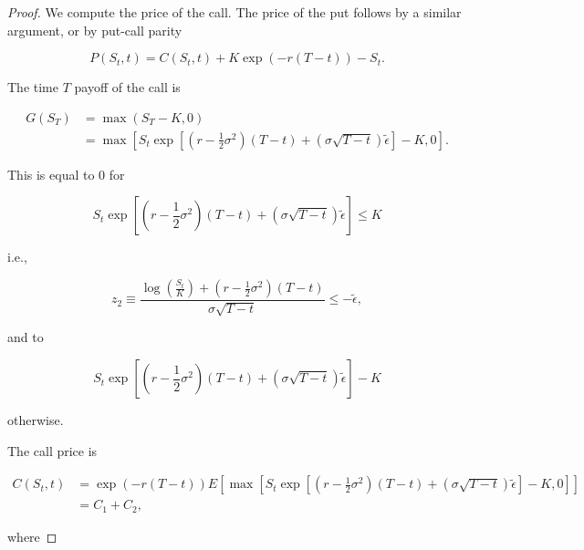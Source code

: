 \documentclass[\topdir/lecture\_notes.tex]{subfiles}
\begin{document}
\begin{proof}
We compute the price of the call. The price of the put follows by a similar argument, or by put-call parity

\begin{equation}
P\left(S_{t}, t\right)=C\left(S_{t}, t\right)+K \exp (-r(T-t))-S_{t} .
\end{equation}

The time $T$ payoff of the call is

\begin{equation}
\begin{aligned}
G\left(S_{T}\right) & =\max \left(S_{T}-K, 0\right) \\
& =\max \left[S_{t} \exp \left[\left(r-\frac{1}{2} \sigma^{2}\right)(T-t)+(\sigma \sqrt{T-t}) \tilde{\epsilon}\right]-K, 0\right] .
\end{aligned}
\end{equation}

This is equal to 0 for

\begin{equation}
S_{t} \exp \left[\left(r-\frac{1}{2} \sigma^{2}\right)(T-t)+(\sigma \sqrt{T-t}) \tilde{\epsilon}\right] \leq K
\end{equation}

i.e.,

\begin{equation}
z_{2} \equiv \frac{\log \left(\frac{S_{t}}{K}\right)+\left(r-\frac{1}{2} \sigma^{2}\right)(T-t)}{\sigma \sqrt{T-t}} \leq-\tilde{\epsilon},
\end{equation}

and to

\begin{equation}
S_{t} \exp \left[\left(r-\frac{1}{2} \sigma^{2}\right)(T-t)+(\sigma \sqrt{T-t}) \tilde{\epsilon}\right]-K
\end{equation}

otherwise.

The call price is

\begin{equation}
\begin{aligned}
C\left(S_{t}, t\right) & =\exp (-r(T-t)) E\left[\max \left[S_{t} \exp \left[\left(r-\frac{1}{2} \sigma^{2}\right)(T-t)+(\sigma \sqrt{T-t}) \tilde{\epsilon}\right]-K, 0\right]\right] \\
& =C_{1}+C_{2},
\end{aligned}
\end{equation}

where


\end{proof}
\end{document}
